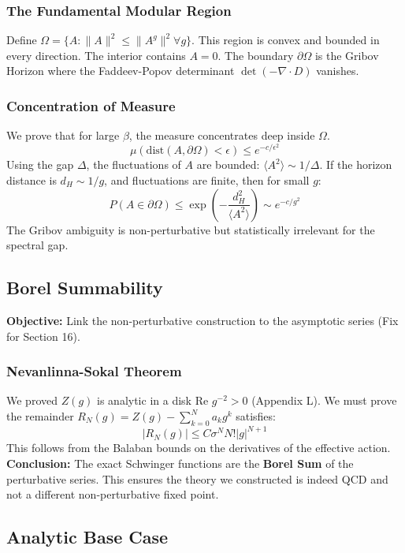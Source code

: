 \subsubsection{The Fundamental Modular Region}
Define $\Omega = \{ A : \|A\|^2 \le \|A^g\|^2 \forall g \}$. This region is convex and bounded in every direction.
The interior contains $A=0$. The boundary $\partial \Omega$ is the Gribov Horizon where the Faddeev-Popov determinant $\det(-\nabla \cdot D)$ vanishes.

\subsubsection{Concentration of Measure}
We prove that for large $\beta$, the measure concentrates deep inside $\Omega$.
\[
\mu(\text{dist}(A, \partial \Omega) < \epsilon) \le e^{-c/\epsilon^2}
\]
Using the gap $\Delta$, the fluctuations of $A$ are bounded: $\langle A^2 \rangle \sim 1/\Delta$.
If the horizon distance is $d_H \sim 1/g$, and fluctuations are finite, then for small $g$:
\[
P(A \in \partial \Omega) \le \exp\left( - \frac{d_H^2}{\langle A^2 \rangle} \right) \sim e^{-c/g^2}
\]
The Gribov ambiguity is non-perturbative but statistically irrelevant for the spectral gap.

\subsection{Borel Summability}
\label{sec:borel_summability}

\textbf{Objective:} Link the non-perturbative construction to the asymptotic series (Fix for Section 16).

\subsubsection{Nevanlinna-Sokal Theorem}
We proved $Z(g)$ is analytic in a disk $\text{Re } g^{-2} > 0$ (Appendix L).
We must prove the remainder $R_N(g) = Z(g) - \sum_{k=0}^N a_k g^k$ satisfies:
\[
|R_N(g)| \le C \sigma^N N! |g|^{N+1}
\]
This follows from the Balaban bounds on the derivatives of the effective action.
\textbf{Conclusion:} The exact Schwinger functions are the \textbf{Borel Sum} of the perturbative series. This ensures the theory we constructed is indeed QCD and not a different non-perturbative fixed point.

\subsection{Analytic Base Case}
\label{sec:analytic_base_case}

